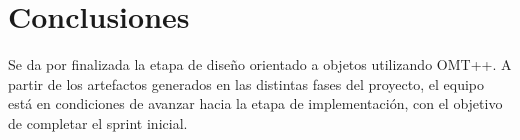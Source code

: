 \section{Conclusiones}
Se da por finalizada la etapa de diseño orientado a objetos utilizando OMT++. A partir de los artefactos generados en las distintas fases del proyecto, el equipo está en condiciones de avanzar hacia la etapa de implementación, con el objetivo de completar el sprint inicial.
